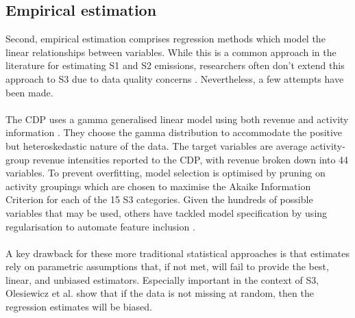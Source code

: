 \documentclass[12pt,twoside]{report}
\begin{document}
\subsection{Empirical estimation}

Second, empirical estimation comprises regression methods which model the linear relationships between variables. While this is a common approach in the literature for estimating S1 and S2 emissions, researchers often don't extend this approach to S3 due to data quality concerns \cite{GoldhammerEtAl2017, KalesnikVitali2022}. Nevertheless, a few attempts have been made.
\\ \\
The CDP uses a gamma generalised linear model using both revenue and activity information \cite{cdp2023b}. They choose the gamma distribution to accommodate the positive but heteroskedastic nature of the data. The target variables are average activity-group revenue intensities reported to the CDP, with revenue broken down into 44 variables. To prevent overfitting, model selection is optimised by pruning on activity groupings which are chosen to maximise the Akaike Information Criterion for each of the 15 S3 categories. Given the hundreds of possible variables that may be used, others have tackled model specification by using regularisation to automate feature inclusion \cite{CaiXia2023}.
\\ \\
A key drawback for these more traditional statistical approaches is that estimates rely on parametric assumptions that, if not met, will fail to provide the best, linear, and unbiased estimators. Especially important in the context of S3, Olesiewicz et al. \cite{olesiewicz2021} show that if the data is not missing at random, then the regression estimates will be biased.
\end{document}
